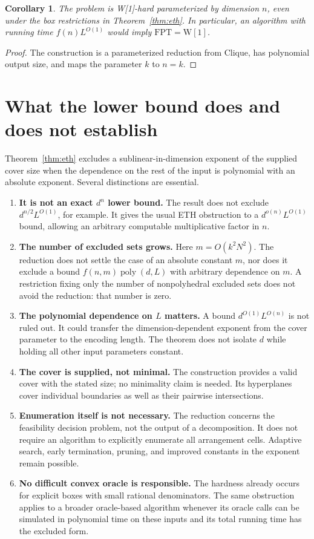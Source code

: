 \documentclass[11pt]{article}
\newtheorem{corollary}[theorem]{Corollary}
\begin{document}
\begin{corollary}
The problem is W[1]-hard parameterized by dimension $n$, even under the box restrictions in Theorem~\ref{thm:eth}. In particular, an algorithm with running time $f(n)L^{O(1)}$ would imply $\mathrm{FPT}=\mathrm{W[1]}$.
\end{corollary}
\begin{proof}
The construction is a parameterized reduction from Clique, has polynomial output size, and maps the parameter $k$ to $n=k$.
\end{proof}

\section{What the lower bound does and does not establish}
Theorem~\ref{thm:eth} excludes a sublinear-in-dimension exponent of the supplied cover size when the dependence on the rest of the input is polynomial with an absolute exponent. Several distinctions are essential.
\begin{enumerate}
\item \textbf{It is not an exact $d^n$ lower bound.} The result does not exclude $d^{n/2}L^{O(1)}$, for example. It gives the usual ETH obstruction to a $d^{o(n)}L^{O(1)}$ bound, allowing an arbitrary computable multiplicative factor in $n$.
\item \textbf{The number of excluded sets grows.} Here $m=O(k^2N^2)$. The reduction does not settle the case of an absolute constant $m$, nor does it exclude a bound $f(n,m)\operatorname{poly}(d,L)$ with arbitrary dependence on $m$. A restriction fixing only the number of nonpolyhedral excluded sets does not avoid the reduction: that number is zero.
\item \textbf{The polynomial dependence on $L$ matters.} A bound $d^{O(1)}L^{O(n)}$ is not ruled out. It could transfer the dimension-dependent exponent from the cover parameter to the encoding length. The theorem does not isolate $d$ while holding all other input parameters constant.
\item \textbf{The cover is supplied, not minimal.} The construction provides a valid cover with the stated size; no minimality claim is needed. Its hyperplanes cover individual boundaries as well as their pairwise intersections.
\item \textbf{Enumeration itself is not necessary.} The reduction concerns the feasibility decision problem, not the output of a decomposition. It does not require an algorithm to explicitly enumerate all arrangement cells. Adaptive search, early termination, pruning, and improved constants in the exponent remain possible.
\item \textbf{No difficult convex oracle is responsible.} The hardness already occurs for explicit boxes with small rational denominators. The same obstruction applies to a broader oracle-based algorithm whenever its oracle calls can be simulated in polynomial time on these inputs and its total running time has the excluded form.
\end{enumerate}
\end{document}
